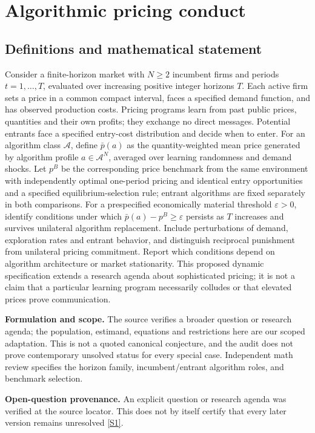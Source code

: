\documentclass[11pt]{article}
\newcommand{\sref}[2]{\hyperlink{source:#1:#2}{[S#2]}}
\begin{document}
\section*{Algorithmic pricing conduct}\label{30007680}
\subsection{Definitions and mathematical statement}
Consider a finite-horizon market with \(N\geq2\) incumbent firms and periods \(t=1,\ldots,T\), evaluated over increasing positive integer horizons \(T\). Each active firm sets a price in a common compact interval, faces a specified demand function, and has observed production costs. Pricing programs learn from past public prices, quantities and their own profits; they exchange no direct messages. Potential entrants face a specified entry-cost distribution and decide when to enter. For an algorithm class \(\mathcal A\), define \(\bar p(a)\) as the quantity-weighted mean price generated by algorithm profile \(a\in\mathcal A^N\), averaged over learning randomness and demand shocks. Let \(p^B\) be the corresponding price benchmark from the same environment with independently optimal one-period pricing and identical entry opportunities and a specified equilibrium-selection rule; entrant algorithms are fixed separately in both comparisons. For a prespecified economically material threshold \(\varepsilon>0\), identify conditions under which \(\bar p(a)-p^B\geq\varepsilon\) persists as \(T\) increases and survives unilateral algorithm replacement. Include perturbations of demand, exploration rates and entrant behavior, and distinguish reciprocal punishment from unilateral pricing commitment. Report which conditions depend on algorithm architecture or market stationarity. This proposed dynamic specification extends a research agenda about sophisticated pricing; it is not a claim that a particular learning program necessarily colludes or that elevated prices prove communication.

\par\textbf{Formulation and scope.} The source verifies a broader question or research agenda; the population, estimand, equations and restrictions here are our scoped adaptation. This is not a quoted canonical conjecture, and the audit does not prove contemporary unsolved status for every special case. Independent math review specifies the horizon family, incumbent/entrant algorithm roles, and benchmark selection.

\par\textbf{Open-question provenance.} An explicit question or research agenda was verified at the source locator. This does not by itself certify that every later version remains unresolved \sref{30007680}{1}.
\end{document}
